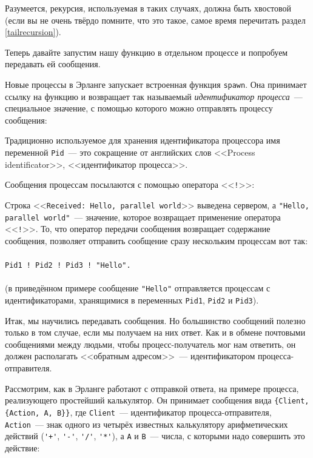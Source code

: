 \documentclass[
  paper=a4,
  fontsize=14pt,
  openany,
  appendixprefix=true
]{scrbook}
\begin{document}

Разумеется, рекурсия, используемая в таких случаях, должна быть хвостовой (если вы не очень твёрдо помните, что это такое, самое время перечитать раздел \ref{tailrecursion}).

Теперь давайте запустим нашу функцию в отдельном процессе и попробуем передавать ей сообщения.

Новые процессы в Эрланге запускает встроенная функция \lstinline{spawn}. Она принимает ссылку на функцию и возвращает так называемый {\em идентификатор процесса}~--- специальное значение, с помощью которого можно отправлять процессу сообщения:


Традиционно используемое для хранения идентификатора процессора имя переменной \lstinline{Pid}~--- это сокращение от английских слов <<Process identificator>>, <<идентификатор процесса>>.

Сообщения процессам посылаются с помощью оператора <<\lstinline{!}>>:


Строка <<\lstinline{Received: Hello, parallel world}>> выведена сервером, а \lstinline{"Hello, parallel world"}~--- значение, которое возвращает применение оператора <<\lstinline{!}>>. То, что оператор передачи сообщения возвращает содержание сообщения, позволяет отправить сообщение сразу нескольким процессам вот так:\\\\\lstinline{Pid1 ! Pid2 ! Pid3 ! "Hello".}\\\\
(в приведённом примере сообщение \lstinline{"Hello"} отправляется процессам с идентификаторами, хранящимися в переменных \lstinline{Pid1}, \lstinline{Pid2} и \lstinline{Pid3}).

Итак, мы научились передавать сообщения. Но большинство сообщений полезно только в том случае, если мы получаем на них ответ. Как и в обмене почтовыми сообщениями между людьми, чтобы процесс-получатель мог нам ответить, он должен располагать <<обратным адресом>>~--- идентификатором процесса-отправителя.

Рассмотрим, как в Эрланге работают с отправкой ответа, на примере процесса, реализующего простейший калькулятор. Он принимает сообщения вида \lstinline!{Client, {Action, A, B}}!, где \lstinline{Client}~--- идентификатор процесса-отправителя, \lstinline{Action}~--- знак одного из четырёх известных калькулятору арифметических действий (\lstinline{'+'}, \lstinline{'-'}, \lstinline{'/'}, \lstinline{'*'}), а \lstinline{A} и \lstinline{B}~--- числа, с которыми надо совершить это действие:
\end{document}
